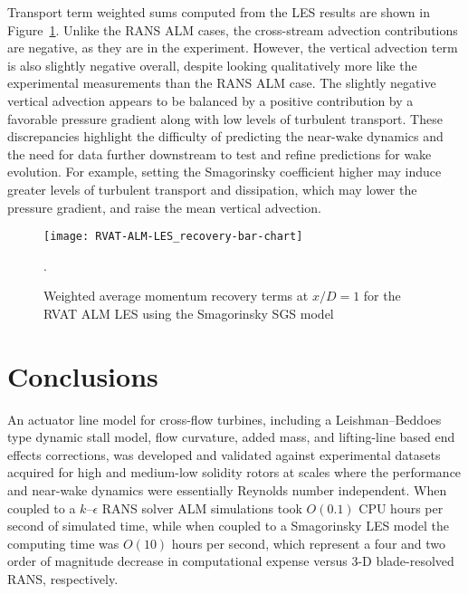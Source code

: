 Transport term weighted sums computed from the LES results are shown in
Figure~\ref{fig:RVAT-ALM-LES-recovery}. Unlike the RANS ALM cases, the
cross-stream advection contributions are negative, as they are in the
experiment. However, the vertical advection term is also slightly negative
overall, despite looking qualitatively more like the experimental measurements
than the RANS ALM case. The slightly negative vertical advection appears to be
balanced by a positive contribution by a favorable pressure gradient along with
low levels of turbulent transport. These discrepancies highlight the difficulty
of predicting the near-wake dynamics and the need for data further downstream to
test and refine predictions for wake evolution. For example, setting the
Smagorinsky coefficient higher may induce greater levels of turbulent transport
and dissipation, which may lower the pressure gradient, and raise the mean
vertical advection.

\begin{figure}
    \centering
    
    \texttt{[image: RVAT-ALM-LES\_recovery-bar-chart]}
    
    \caption{Weighted average momentum recovery terms at $x/D=1$ for the RVAT
        ALM LES using the Smagorinsky SGS model}.
    
    \label{fig:RVAT-ALM-LES-recovery}
\end{figure}


\section{Conclusions}

An actuator line model for cross-flow turbines, including a Leishman--Beddoes
type dynamic stall model, flow curvature, added mass, and lifting-line based end
effects corrections, was developed and validated against experimental datasets
acquired for high and medium-low solidity rotors at scales where the performance
and near-wake dynamics were essentially Reynolds number independent. When
coupled to a $k$--$\epsilon$ RANS solver ALM simulations took $O(0.1)$ CPU hours
per second of simulated time, while when coupled to a Smagorinsky LES model the
computing time was $O(10)$ hours per second, which represent a four and two
order of magnitude decrease in computational expense versus 3-D blade-resolved
RANS, respectively.

